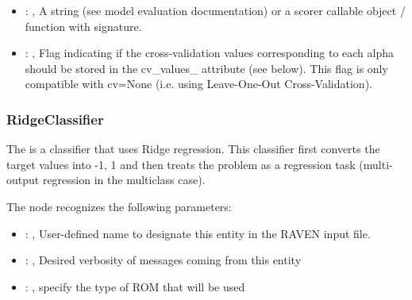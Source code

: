 \begin{itemize}
    \item {}: , 
      A string (see model evaluation documentation) or a scorer
      callable object / function with signature.

    \item {}: , 
      Flag indicating if the cross-validation values corresponding
      to each alpha should be stored in the cv\_values\_ attribute (see below).
      This flag is only compatible with cv=None (i.e. using Leave-One-Out
      Cross-Validation).
  \end{itemize}


\subsubsection{RidgeClassifier}
  The  is a classifier that uses Ridge regression.
  This classifier first converts the target values into {-1, 1} and then treats
  the problem as a regression task (multi-output regression in the multiclass case).

  The  node recognizes the following parameters:
    \begin{itemize}
      \item {}: , 
        User-defined name to designate this entity in the RAVEN input file.
      \item {}: , 
        Desired verbosity of messages coming from this entity
      \item {}: , 
        specify the type of ROM that will be used
  \end{itemize}

